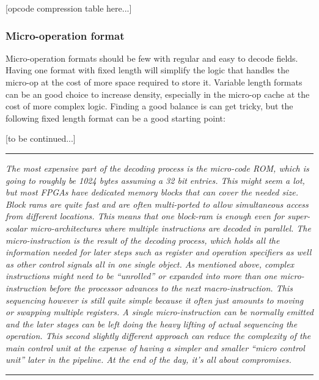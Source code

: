                 [opcode compression table here...]

            \subsubsection{Micro-operation format}

                Micro-operation formats should be few with regular and easy to decode fields. Having one format with fixed length will simplify the logic that handles the micro-op at the cost of more space required to store it. Variable length formats can be an good choice to increase density, especially in the micro-op cache at the cost of more complex logic. Finding a good balance is can get tricky, but the following fixed length format can be a good starting point:

                [to be continued...]

        \par\noindent\rule{\textwidth}{0.4pt}
        \textit{The most expensive part of the decoding process is the micro-code ROM, which is going to roughly be 1024 bytes assuming a 32 bit entries. This might seem a lot, but most FPGAs have dedicated memory blocks that can cover the needed size. Block rams are quite fast and are often multi-ported to allow simultaneous access from different locations. This means that one block-ram is enough even for super-scalar micro-architectures where multiple instructions are decoded in parallel. The micro-instruction is the result of the decoding process, which holds all the information needed for later steps such as register and operation specifiers as well as other control signals all in one single object. As mentioned above, complex instructions might need to be ``unrolled'' or expanded into more than one micro-instruction before the processor advances to the next macro-instruction. This sequencing however is still quite simple because it often just amounts to moving or swapping multiple registers. A single micro-instruction can be normally emitted and the later stages can be left doing the heavy lifting of actual sequencing the operation. This second slightly different approach can reduce the complexity of the main control unit at the expense of having a simpler and smaller ``micro control unit'' later in the pipeline. At the end of the day, it's all about compromises.}
        \par\noindent\rule{\textwidth}{0.4pt}